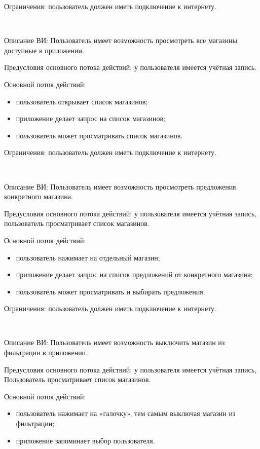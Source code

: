 Ограничения: пользователь должен иметь подключение к интернету.
 
~\par
\label{use:showstores}
Описание ВИ: Пользователь имеет возможность просмотреть все магазины доступные в приложении.
 
Предусловия основного потока действий: у пользователя имеется учётная запись.
 
Основной поток действий:
\begin{itemize}
   \item пользователь открывает список магазинов;
   \item приложение делает запрос на список магазинов;
   \item пользователь может просматривать список магазинов.
\end{itemize}
 
Ограничения: пользователь должен иметь подключение к интернету.

~\par
\label{use:singlestore}
Описание ВИ: Пользователь имеет возможность просмотреть предложения конкретного магазина.
 
Предусловия основного потока действий: у пользователя имеется учётная запись, пользователь просматривает список магазинов.
 
Основной поток действий:
\begin{itemize}
   \item пользователь нажимает на отдельный магазин;
   \item приложение делает запрос на список предложений от конкретного магазина;
   \item пользователь может просматривать и выбирать предложения.
\end{itemize}
 
Ограничения: пользователь должен иметь подключение к интернету.

~\par
Описание ВИ: Пользователь имеет возможность выключить магазин из фильтрации в приложении.
 
Предусловия основного потока действий: у пользователя имеется учётная запись, Пользователь просматривает список магазинов.
 
Основной поток действий:
\begin{itemize}
   \item пользователь нажимает на «галочку», тем самым выключая магазин из фильтрации;
   \item приложение запоминает выбор пользователя.
\end{itemize}

